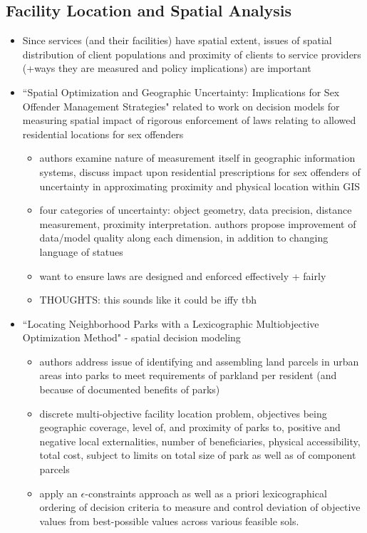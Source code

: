 \documentclass{article}
\begin{document}
\subsection{Facility Location and Spatial Analysis}
\begin{itemize}
\item Since services (and their facilities) have spatial extent, issues of spatial distribution of client populations and proximity of clients to service providers (+ways they are measured and policy implications) are important
\item ``Spatial Optimization and Geographic Uncertainty: Implications for Sex Offender Management Strategies" related to work on decision models for measuring spatial impact of rigorous enforcement of laws relating to allowed residential locations for sex offenders
	\begin{itemize}
	\item authors examine nature of measurement itself in geographic information systems, discuss impact upon residential prescriptions for sex offenders of uncertainty in approximating proximity and physical location within GIS
	\item four categories of uncertainty: object geometry, data precision, distance measurement, proximity interpretation. authors propose improvement of data/model quality along each dimension, in addition to changing language of statues
	\item want to ensure laws are designed and enforced effectively + fairly
	\item THOUGHTS: this sounds like it could be iffy tbh
	\end{itemize}
\item ``Locating Neighborhood Parks with a Lexicographic Multiobjective Optimization Method" - spatial decision modeling
	\begin{itemize}
	\item authors address issue of identifying and assembling land parcels in urban areas into parks to meet requirements of parkland per resident (and because of documented benefits of parks)
	\item discrete multi-objective facility location problem, objectives being geographic coverage, level of, and proximity of parks to, positive and negative local externalities, number of beneficiaries, physical accessibility, total cost, subject to limits on total size of park as well as of component parcels
	\item apply an $\epsilon$-constraints approach as well as a priori lexicographical ordering of decision criteria to measure and control deviation of objective values from best-possible values across various feasible sols.

\end{itemize}
\end{itemize}
\end{document}
